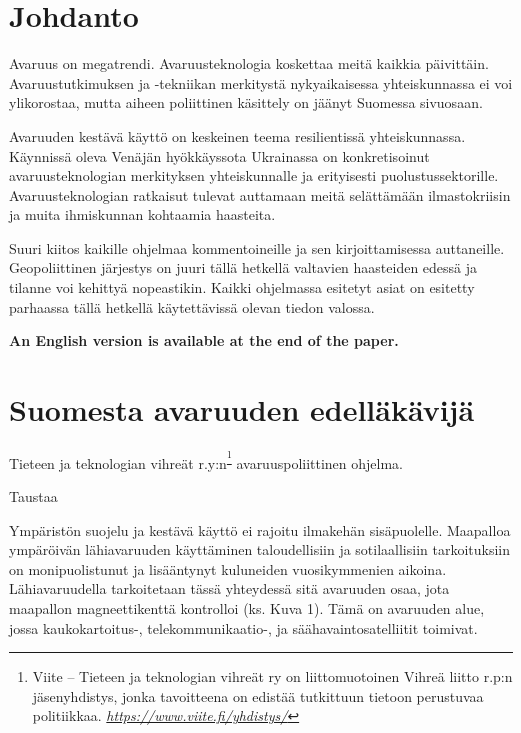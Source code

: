 \section{Johdanto}

Avaruus on megatrendi. Avaruusteknologia koskettaa meitä kaikkia
päivittäin. Avaruustutkimuksen ja -tekniikan merkitystä nykyaikaisessa
yhteiskunnassa ei voi ylikorostaa, mutta aiheen poliittinen käsittely on
jäänyt Suomessa sivuosaan.

Avaruuden kestävä käyttö on keskeinen teema resilientissä
yhteiskunnassa. Käynnissä oleva Venäjän hyökkäyssota Ukrainassa on
konkretisoinut avaruusteknologian merkityksen yhteiskunnalle ja
erityisesti puolustussektorille. Avaruusteknologian ratkaisut tulevat
auttamaan meitä selättämään ilmastokriisin ja muita ihmiskunnan
kohtaamia haasteita.

Suuri kiitos kaikille ohjelmaa kommentoineille ja sen kirjoittamisessa
auttaneille. Geopoliittinen järjestys on juuri tällä hetkellä valtavien
haasteiden edessä ja tilanne voi kehittyä nopeastikin. Kaikki ohjelmassa
esitetyt asiat on esitetty parhaassa tällä hetkellä käytettävissä olevan
tiedon valossa.

\textbf{An English version is available at the end of the paper. }

\section{Suomesta avaruuden edelläkävijä}

Tieteen ja teknologian vihreät r.y:n\textsuperscript{\footnote{Viite --
  Tieteen ja teknologian vihreät ry on liittomuotoinen Vihreä liitto
  r.p:n jäsenyhdistys, jonka tavoitteena on edistää tutkittuun tietoon
  perustuvaa politiikkaa.
  \href{https://www.viite.fi/yhdistys/}{\emph{https://www.viite.fi/yhdistys/}}}}
avaruuspoliittinen ohjelma.

\protect\hypertarget{anchor}{}{}Taustaa

Ympäristön suojelu ja kestävä käyttö ei rajoitu ilmakehän sisäpuolelle.
Maapalloa ympäröivän lähiavaruuden käyttäminen taloudellisiin ja
sotilaallisiin tarkoituksiin on monipuolistunut ja lisääntynyt
kuluneiden vuosikymmenien aikoina. Lähiavaruudella tarkoitetaan tässä
yhteydessä sitä avaruuden osaa, jota maapallon magneettikenttä
kontrolloi (ks. Kuva 1). Tämä on avaruuden alue, jossa kaukokartoitus-,
telekommunikaatio-, ja säähavaintosatelliitit toimivat.

\protect\hypertarget{anchor-1}{}{}

